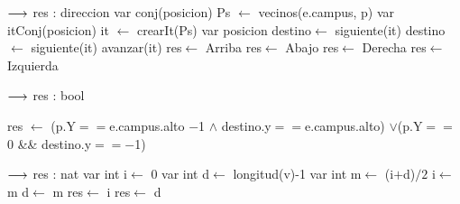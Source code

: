 \begin{algorithm}[H]
\begin{algorithmic}[1]
 {$\longrightarrow$ res : direccion} 
	\State var conj(posicion) Ps $\gets$ vecinos(e.campus, p) 
	\State var itConj(posicion) it $\gets$ crearIt(Ps) 
	\State var posicion destino$\gets$ siguiente(it) 
	 
		 
			 
				\State destino$\gets$ siguiente(it) 
			\EndIf
		\EndIf
		\State avanzar(it) 
	\EndWhile
	 
		 
			\State res$\gets$ Arriba \Else {}
			\State res$\gets$ Abajo 
		\EndIf
	\Else
		 
			\State res$\gets$ Derecha \Else {}
			\State res$\gets$ Izquierda 
		\EndIf
	\EndIf
\EndFunction
\end{algorithmic}
\end{algorithm}


\begin{algorithm}[H]
\begin{algorithmic}[1]
 {$\longrightarrow$ res : bool} 

	\State res $\gets$ (p.Y$==$e.campus.alto $-$1 $\wedge$ destino.y$==$e.campus.alto) $\vee$(p.Y$==$0 && destino.y$==-$1) 
\EndFunction
\end{algorithmic}
\end{algorithm}


\begin{algorithm}[H]
\begin{algorithmic}[1]
 {$\longrightarrow$ res : nat} 
	\State var int i$\gets$ 0 
	\State var int d$\gets$ longitud(v)-1 
		\State var int m$\gets$  (i$+$d)$/2$ 
		 
			\State i$\gets$ m \Else {}
			\State d$\gets$ m 
		\EndIf
	\EndWhile
	 
		\State res$\gets$ i \Else {}
		\State res$\gets$ d 
	\EndIf
\EndFunction
\end{algorithmic}
\end{algorithm}


